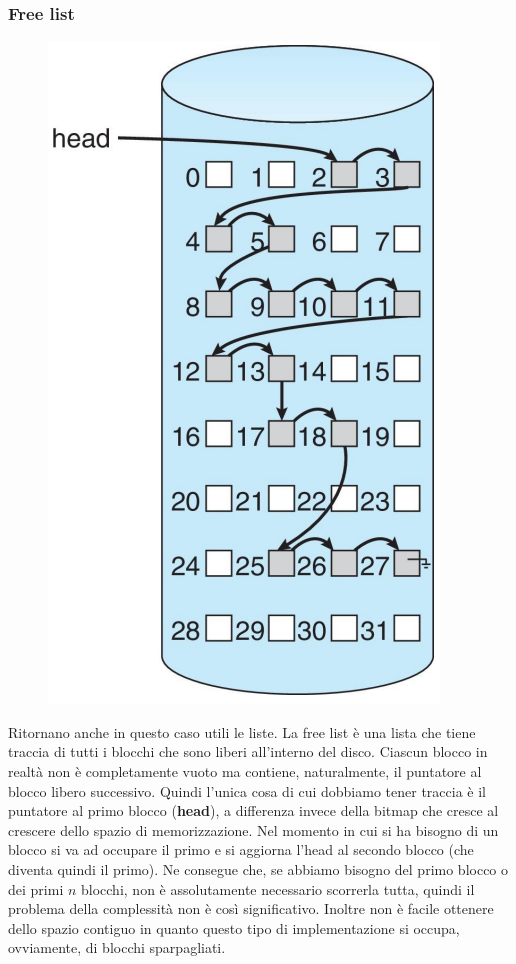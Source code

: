 % 
\subsubsection{Free list}
\begin{figure}
    \centering
    \includegraphics[width = .25\textwidth]{../res/imgs/file system implementation/free-space list.png}
\end{figure}
Ritornano anche in questo caso utili le liste. La free list è una lista che tiene traccia di tutti i blocchi che sono liberi all'interno del disco. Ciascun blocco in realtà non è completamente vuoto ma contiene, naturalmente, il puntatore al blocco libero successivo. Quindi l'unica cosa di cui dobbiamo tener traccia è il puntatore al primo blocco (\textbf{head}), a differenza invece della bitmap che cresce al crescere dello spazio di memorizzazione. Nel momento in cui si ha bisogno di un blocco si va ad occupare il primo e si aggiorna l'head al secondo blocco (che diventa quindi il primo). Ne consegue che, se abbiamo bisogno del primo blocco o dei primi $n$ blocchi, non è assolutamente necessario scorrerla tutta, quindi il problema della complessità non è così significativo. Inoltre non è facile ottenere dello spazio contiguo in quanto questo tipo di implementazione si occupa, ovviamente, di blocchi sparpagliati. 

% 
